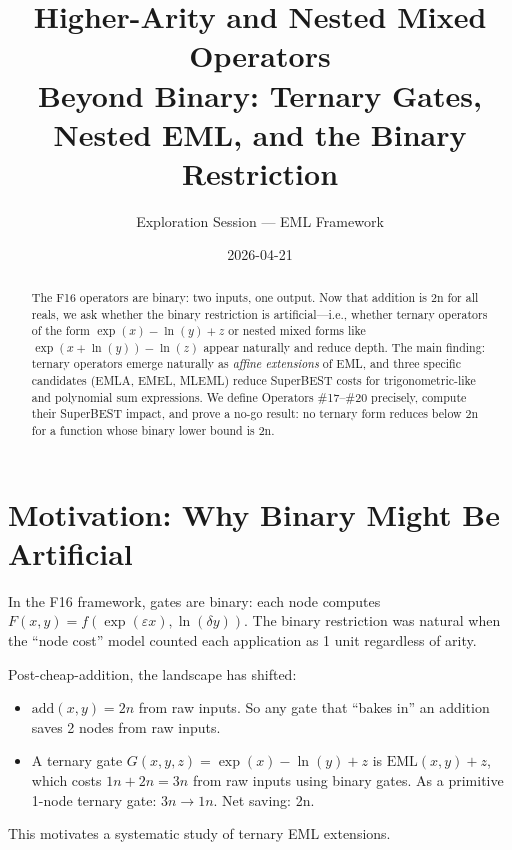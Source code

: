 \documentclass[11pt]{article}
\title{Higher-Arity and Nested Mixed Operators\\
{\large Beyond Binary: Ternary Gates, Nested EML, and the Binary Restriction}}
\author{Exploration Session --- EML Framework}
\date{2026-04-21}
\begin{document}
\maketitle

\begin{abstract}
The F16 operators are binary: two inputs, one output.
Now that addition is 2n for all reals, we ask whether the binary restriction
is artificial---i.e., whether ternary operators of the form
$\exp(x) - \ln(y) + z$ or nested mixed forms like
$\exp(x + \ln(y)) - \ln(z)$ appear naturally and reduce depth.
The main finding: ternary operators emerge naturally as \emph{affine extensions}
of EML, and three specific candidates (EMLA, EMEL, MLEML) reduce
SuperBEST costs for trigonometric-like and polynomial sum expressions.
We define Operators \#17--\#20 precisely, compute their SuperBEST impact,
and prove a no-go result: no ternary form reduces below 2n for a function
whose binary lower bound is 2n.
\end{abstract}

\tableofcontents
\bigskip

\section{Motivation: Why Binary Might Be Artificial}
\label{sec:motivation}

In the F16 framework, gates are binary: each node computes
$F(x,y) = f(\exp(\varepsilon x), \ln(\delta y))$.
The binary restriction was natural when the ``node cost'' model counted
each application as 1 unit regardless of arity.

Post-cheap-addition, the landscape has shifted:
\begin{itemize}
  \item $\mathrm{add}(x,y) = 2n$ from raw inputs. So any gate that
        ``bakes in'' an addition saves 2 nodes from raw inputs.
  \item A ternary gate $G(x,y,z) = \exp(x) - \ln(y) + z$ is $\mathrm{EML}(x,y) + z$,
        which costs $1n + 2n = 3n$ from raw inputs using binary gates.
        As a primitive 1-node ternary gate: $3n \to 1n$. Net saving: 2n.
\end{itemize}

This motivates a systematic study of ternary EML extensions.

\end{document}
